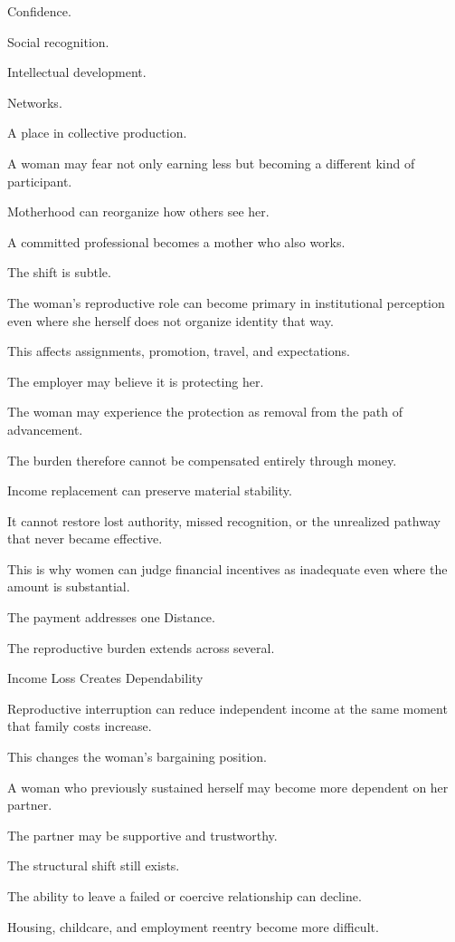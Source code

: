 Confidence.

Social recognition.

Intellectual development.

Networks.

A place in collective production.

A woman may fear not only earning less but becoming a different kind of participant.

Motherhood can reorganize how others see her.

A committed professional becomes a mother who also works.

The shift is subtle.

The woman’s reproductive role can become primary in institutional perception even where she herself does not organize identity that way.

This affects assignments, promotion, travel, and expectations.

The employer may believe it is protecting her.

The woman may experience the protection as removal from the path of advancement.

The burden therefore cannot be compensated entirely through money.

Income replacement can preserve material stability.

It cannot restore lost authority, missed recognition, or the unrealized pathway that never became effective.

This is why women can judge financial incentives as inadequate even where the amount is substantial.

The payment addresses one Distance.

The reproductive burden extends across several.

Income Loss Creates Dependability

Reproductive interruption can reduce independent income at the same moment that family costs increase.

This changes the woman’s bargaining position.

A woman who previously sustained herself may become more dependent on her partner.

The partner may be supportive and trustworthy.

The structural shift still exists.

The ability to leave a failed or coercive relationship can decline.

Housing, childcare, and employment reentry become more difficult.

